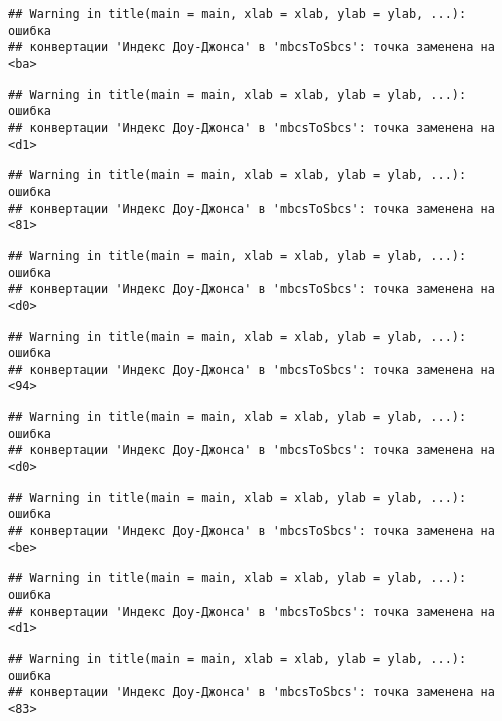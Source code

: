 \documentclass[
]{article}
\begin{document}
\begin{verbatim}
## Warning in title(main = main, xlab = xlab, ylab = ylab, ...): ошибка
## конвертации 'Индекс Доу-Джонса' в 'mbcsToSbcs': точка заменена на <ba>
\end{verbatim}

\begin{verbatim}
## Warning in title(main = main, xlab = xlab, ylab = ylab, ...): ошибка
## конвертации 'Индекс Доу-Джонса' в 'mbcsToSbcs': точка заменена на <d1>
\end{verbatim}

\begin{verbatim}
## Warning in title(main = main, xlab = xlab, ylab = ylab, ...): ошибка
## конвертации 'Индекс Доу-Джонса' в 'mbcsToSbcs': точка заменена на <81>
\end{verbatim}

\begin{verbatim}
## Warning in title(main = main, xlab = xlab, ylab = ylab, ...): ошибка
## конвертации 'Индекс Доу-Джонса' в 'mbcsToSbcs': точка заменена на <d0>
\end{verbatim}

\begin{verbatim}
## Warning in title(main = main, xlab = xlab, ylab = ylab, ...): ошибка
## конвертации 'Индекс Доу-Джонса' в 'mbcsToSbcs': точка заменена на <94>
\end{verbatim}

\begin{verbatim}
## Warning in title(main = main, xlab = xlab, ylab = ylab, ...): ошибка
## конвертации 'Индекс Доу-Джонса' в 'mbcsToSbcs': точка заменена на <d0>
\end{verbatim}

\begin{verbatim}
## Warning in title(main = main, xlab = xlab, ylab = ylab, ...): ошибка
## конвертации 'Индекс Доу-Джонса' в 'mbcsToSbcs': точка заменена на <be>
\end{verbatim}

\begin{verbatim}
## Warning in title(main = main, xlab = xlab, ylab = ylab, ...): ошибка
## конвертации 'Индекс Доу-Джонса' в 'mbcsToSbcs': точка заменена на <d1>
\end{verbatim}

\begin{verbatim}
## Warning in title(main = main, xlab = xlab, ylab = ylab, ...): ошибка
## конвертации 'Индекс Доу-Джонса' в 'mbcsToSbcs': точка заменена на <83>
\end{verbatim}
\end{document}
